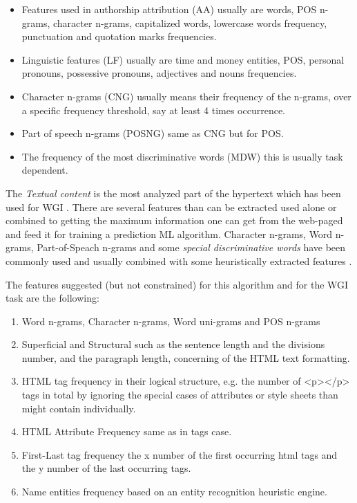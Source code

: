 \begin{itemize}
\item Features used in authorship attribution (AA) usually are words, POS n-grams, character n-grams, capitalized words, lowercase words frequency, punctuation and quotation marks frequencies. 
\item Linguistic features (LF) usually are time and money entities, POS, personal pronouns, possessive pronouns, adjectives and nouns frequencies. 
\item Character n-grams (CNG) usually means their frequency of the n-grams, over a specific frequency threshold, say at least 4 times occurrence. 
\item Part of speech n-grams (POSNG) same as CNG but for POS.
\item The frequency of the most discriminative words (MDW) this is usually task dependent.
\end{itemize}

The \textit{Textual content} is the most analyzed part of the hypertext which has been used for WGI \parencite{mason2009distance,Sharroff2010}. There are several features than can be extracted used alone or combined to getting the maximum information one can get from the web-paged and feed it for training a prediction ML algorithm. Character n-grams, Word n-grams, Part-of-Speach n-grams and some \textit{special discriminative words} have been commonly used and usually combined with some heuristically extracted features \parencite{kanaris2009learning,kumari2014web,levering2008using,Lim2005,mason2009n,onan2018ensemble,petrenz2011stable,sharoff2010web,Nooralahzadeh2014}.

\parencite{waltinger2010feature} The features suggested (but not constrained) for this algorithm and for the WGI task are the following:

\begin{enumerate}
\item Word n-grams, Character n-grams, Word uni-grams and POS n-grams
\item Superficial and Structural such as the sentence length and the divisions number, and the paragraph length, concerning of the HTML text formatting.
\item HTML tag frequency in their logical structure, e.g. the number of <p></p> tags in total by ignoring the special cases of attributes or style sheets than might contain individually.
\item HTML Attribute Frequency same as in tags case.
\item First-Last tag frequency the x number of  the first occurring html tags and the y number of the last occurring tags.
\item Name entities frequency based on an entity recognition heuristic engine.
\end{enumerate}


